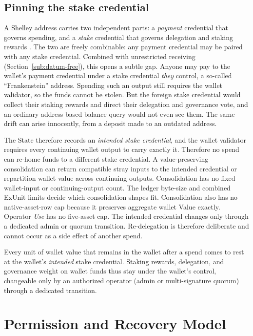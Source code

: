 \documentclass[11pt,DIV=11,parskip=half-]{scrartcl}
\begin{document}
\subsection{Pinning the stake credential}
\label{sub:stake-pinning}
A Shelley address carries two independent parts: a \emph{payment} credential that governs spending, and a \emph{stake} credential that governs delegation and staking rewards \cite{cip19}. The two are freely combinable: any payment credential may be paired with any stake credential. Combined with unrestricted receiving (Section~\ref{sub:datum-free}), this opens a subtle gap. Anyone may pay to the wallet's payment credential under a stake credential \emph{they} control, a so-called ``Frankenstein'' address. Spending such an output still requires the wallet validator, so the funds cannot be stolen. But the foreign stake credential would collect their staking rewards and direct their delegation and governance vote, and an ordinary address-based balance query would not even see them. The same drift can arise innocently, from a deposit made to an outdated address.

The State therefore records an \emph{intended stake credential}, and the wallet validator requires every continuing wallet output to carry exactly it. Therefore no spend can re-home funds to a different stake credential. A value-preserving consolidation can return compatible stray inputs to the intended credential or repartition wallet value across continuing outputs. Consolidation has no fixed wallet-input or continuing-output count. The ledger byte-size and combined ExUnit limits decide which consolidation shapes fit. Consolidation also has no native-asset-row cap because it preserves aggregate wallet Value exactly. Operator \emph{Use} has no five-asset cap. The intended credential changes only through a dedicated admin or quorum transition. Re-delegation is therefore deliberate and cannot occur as a side effect of another spend.

\begin{guaranteebox}
Every unit of wallet value that remains in the wallet after a spend comes to
rest at the wallet's \emph{intended} stake credential. Staking rewards, delegation, and governance
weight on wallet funds thus stay under the wallet's control, changeable only by
an authorized operator (admin or multi-signature quorum) through a dedicated transition.
\end{guaranteebox}

\section{Permission and Recovery Model}
\label{sec:model}
\end{document}
